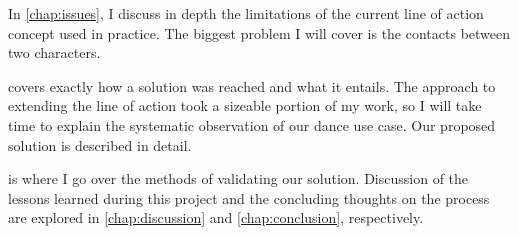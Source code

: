 In \autoref{chap:issues}, I discuss in depth the limitations of the current line of action concept used in practice. The biggest problem I will cover is the contacts between two characters.

 covers exactly how a solution was reached and what it entails. The approach to extending the line of action took a sizeable portion of my work, so I will take time to explain the systematic observation of our dance use case. Our proposed solution is described in detail.

 is where I go over the methods of validating our solution. Discussion of the lessons learned during this project and the concluding thoughts on the process are explored in \autoref{chap:discussion} and \autoref{chap:conclusion}, respectively.

